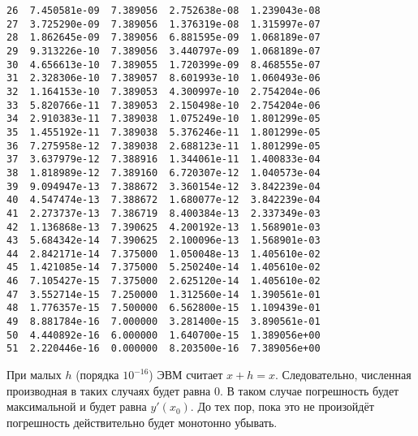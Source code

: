 \documentclass[11pt]{article}
\begin{document}
\begin{tcolorbox}[breakable, size=fbox, boxrule=.5pt, pad at break*=1mm, opacityfill=0]
\begin{Verbatim}[commandchars=\\\{\}]
26  7.450581e-09  7.389056  2.752638e-08  1.239043e-08
27  3.725290e-09  7.389056  1.376319e-08  1.315997e-07
28  1.862645e-09  7.389056  6.881595e-09  1.068189e-07
29  9.313226e-10  7.389056  3.440797e-09  1.068189e-07
30  4.656613e-10  7.389055  1.720399e-09  8.468555e-07
31  2.328306e-10  7.389057  8.601993e-10  1.060493e-06
32  1.164153e-10  7.389053  4.300997e-10  2.754204e-06
33  5.820766e-11  7.389053  2.150498e-10  2.754204e-06
34  2.910383e-11  7.389038  1.075249e-10  1.801299e-05
35  1.455192e-11  7.389038  5.376246e-11  1.801299e-05
36  7.275958e-12  7.389038  2.688123e-11  1.801299e-05
37  3.637979e-12  7.388916  1.344061e-11  1.400833e-04
38  1.818989e-12  7.389160  6.720307e-12  1.040573e-04
39  9.094947e-13  7.388672  3.360154e-12  3.842239e-04
40  4.547474e-13  7.388672  1.680077e-12  3.842239e-04
41  2.273737e-13  7.386719  8.400384e-13  2.337349e-03
42  1.136868e-13  7.390625  4.200192e-13  1.568901e-03
43  5.684342e-14  7.390625  2.100096e-13  1.568901e-03
44  2.842171e-14  7.375000  1.050048e-13  1.405610e-02
45  1.421085e-14  7.375000  5.250240e-14  1.405610e-02
46  7.105427e-15  7.375000  2.625120e-14  1.405610e-02
47  3.552714e-15  7.250000  1.312560e-14  1.390561e-01
48  1.776357e-15  7.500000  6.562800e-15  1.109439e-01
49  8.881784e-16  7.000000  3.281400e-15  3.890561e-01
50  4.440892e-16  6.000000  1.640700e-15  1.389056e+00
51  2.220446e-16  0.000000  8.203500e-16  7.389056e+00
\end{Verbatim}
\end{tcolorbox}
        
    При малых \(h\) (порядка \(10^{-16}\)) ЭВМ считает \(x + h = x\).
Следовательно, численная производная в таких случаях будет равна \(0\).
В таком случае погрешность будет максимальной и будет равна \(y'(x_0)\).
До тех пор, пока это не произойдёт погрешность действительно будет
монотонно убывать.


    
    
    
\end{document}
